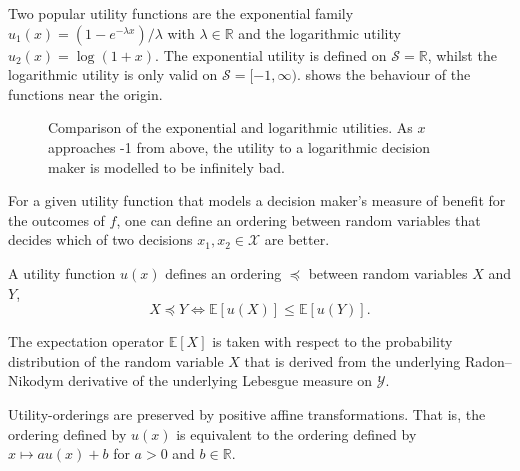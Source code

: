 \documentclass[main.tex]{subfiles}
\begin{document}
\begin{example}
  Two popular utility functions are the exponential family
  $u_1(x)=(1-e^{-\lambda x})/\lambda$ with $\lambda\in\mathbb{R}$ and the logarithmic
  utility $u_2(x)=\log(1+x)$.
  The exponential utility is defined on $\mathcal{S} =\mathbb{R}$,
  whilst the logarithmic utility is only valid on
  $\mathcal{S}=[-1,\infty)$.
   shows the behaviour of the functions
  near the origin.
  \begin{figure}[htbp]
    \centering
    \caption[Comparison of the exponential and logarithmic utilities.]{Comparison of the exponential and logarithmic
      utilities. As $x$ approaches -1 from above, the utility to a logarithmic
      decision maker is modelled to be infinitely bad.
    }\label{fig:example_utilities}
  \end{figure}
\end{example}

For a given utility function that models a decision maker's measure of
benefit for the outcomes of $f$, one can define an ordering
between random variables that decides which of two decisions
$x_1,x_2\in\mathcal{X}$ are better.
\begin{mydef}
  A utility function $u(x)$ defines an ordering $\preceq$ between random
  variables $X$ and $Y$,
  \begin{equation}
    X\preceq Y \Leftrightarrow \mathbb{E}[u(X)] \leq \mathbb{E}[u(Y)].
  \end{equation}
\end{mydef}
The expectation operator $\mathbb{E}[X]$ is taken with respect to the
probability distribution of the random variable $X$ that is derived
from the underlying Radon--Nikodym derivative of the underlying
Lebesgue measure on $\mathcal{Y}$.

\begin{remark}
  Utility-orderings are preserved by positive affine transformations.
  That is, the ordering defined by $u(x)$ is equivalent to the
  ordering defined by $x\mapsto au(x)+b$ for  $a>0$ and $b\in\mathbb{R}$.
\end{remark}
\end{document}

